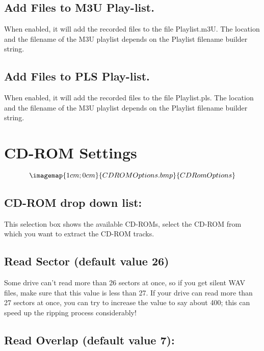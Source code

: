 \subsection{Add Files to M3U Play-list.}

When enabled, it will add the recorded files to the file Playlist.m3U. 
The location and the filename of the M3U playlist depends on the Playlist filename builder string.


\subsection{Add Files to PLS Play-list.}

When enabled, it will add the recorded files to the file Playlist.pls.
The location and the filename of the M3U playlist depends on the Playlist filename builder string.



\section{CD-ROM Settings}

$$\imagemap{1cm;0cm}{CDROMOptions.bmp}{CDRomOptions}$$


\subsection{CD-ROM drop down list:}

This selection box shows the available CD-ROMs, select the CD-ROM from which
you want to extract the CD-ROM tracks.


\subsection{Read Sector (default value 26)}

Some drive can't read more than 26 sectors at once, so if you get silent
WAV files, make sure that this value is less than 27. If your drive can
read more than 27 sectors at once, you can try to increase the value
to say about 400; this can speed up the ripping process considerably!


\subsection{Read Overlap (default value 7):}

